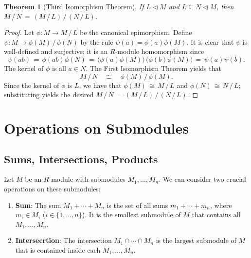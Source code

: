 \documentclass[11pt]{article}
\newtheorem{theorem}{Theorem}
\newcommand{\nsg}{\mathrel{\lhd}}
\begin{document}
\begin{adjustwidth}{0.5cm}{}
  \begin{theorem}[Third Isomorphism Theorem]
    If $L \nsg M$ and $L \subseteq N \nsg M$, then $M \, / \, N \, = \, (M \, / \, L) \, / \, (N \, / \, L)$.
  \end{theorem}
  \begin{proof}
    Let $\phi : M \to M \, / \, L$ be the canonical epimorphism. Define $\psi : M \to \phi(M) \, / \, \phi(N)$ by the rule $\psi(a) = \phi(a)\phi(M)$. It is clear that $\psi$ is well-defined and surjective; it is an $R$-module homomorphism since
    \[
      \psi(ab) \, = \, \phi(ab) \phi(N) \, = \, \big(\phi(a) \phi(M)\big) \, \big(\phi(b) \phi(M) \big) \, = \, \psi(a) \psi(b).
    \]
    The kernel of $\phi$ is all $a \in N$. The First Isomorphism Theorem yields that
    \[
      M \, / \, N \quad \cong \quad \phi(M) \, / \, \phi(M).
    \]
    Since the kernel of $\phi$ is $L$, we have that $\phi(M) \, \cong \, M \, / \, L$ and $\phi(N) \, \cong \, N \, / \, L$; substituting yields the desired $M \, / \, N \, = \, (M \, / \, L) \, / \, (N \, / \, L)$.
  \end{proof}
\end{adjustwidth}


\section{Operations on Submodules}


\subsection{Sums, Intersections, Products}

Let $M$ be an $R$-module with submodules $M_{1}, \ldots, M_{n}$. We can consider two crucial operations on these submodules:
\begin{enumerate}
	\item \textbf{Sum}: The sum $M_{1} + \cdots + M_{n}$ is the set of all sums $m_{1} + \cdots + m_{n}$, where $m_{i} \in M_{i}$ ($i \in \{ 1, \ldots, n \}$). It is the smallest submodule of $M$ that contains all $M_{1}, \ldots, M_{n}$.
	\item \textbf{Intersecrtion}: The intersection $M_{1} \cap \cdots \cap M_{n}$ is the largest submodule of $M$ that is contained inside each $M_{1}, \ldots, M_{n}$.
\end{enumerate}
\end{document}
